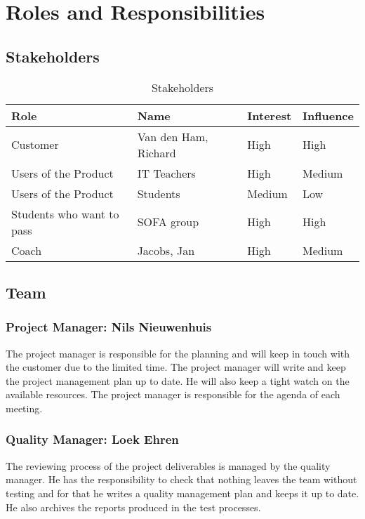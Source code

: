 \section{Roles and Responsibilities}

\subsection{Stakeholders}
\begin{table}[h]
    \begin{tabular}{l|l|l|l}
        \textbf{Role}               &   \textbf{Name}           &   \textbf{Interest}     &     \textbf{Influence}  \\ \hline \hline
        Customer                    &   Van den Ham, Richard    &   High                  &     High                \\ \hline
        Users of the Product        &   IT Teachers             &   High                  &     Medium              \\ \hline
        Users of the Product        &   Students                &   Medium                &     Low                 \\ \hline
        Students who want to pass   &   SOFA group              &   High                  &     High                \\ \hline
        Coach                       &   Jacobs, Jan             &   High                  &     Medium              \\ \hline        
    \end{tabular}
    \caption{Stakeholders}
\end{table}

\subsection{Team}
    \subsubsection{Project Manager: Nils Nieuwenhuis}
    The project manager is responsible for the planning
    and will keep in touch with the customer due to the limited time. The project manager will write and
    keep the project management plan up to date. He will also keep a tight watch on the available
    resources. The project manager is responsible for the agenda of each meeting.

    \subsubsection{Quality Manager: Loek Ehren}
    The reviewing process of the project deliverables is managed by the quality manager. He has the responsibility to check that nothing leaves
    the team without testing and for that he writes a quality management plan and keeps it up to date. He also archives the reports produced
    in the test processes. 

